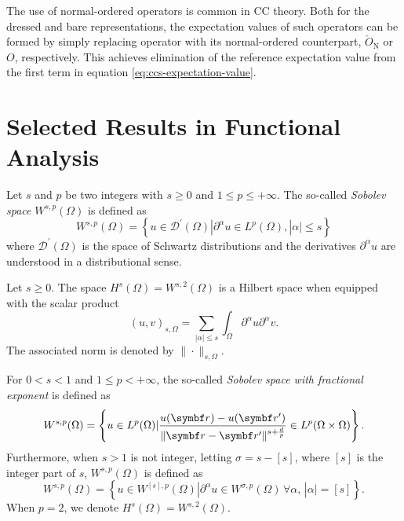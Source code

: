 The use of normal-ordered operators is common in \acrlong*{CC} theory. Both for
the dressed and bare representations, the expectation values of such operators
can be formed by simply replacing operator with its normal-ordered counterpart,
$\check{O}_\mathrm{N}$ or $O$, respectively.
This achieves elimination of the reference expectation value from the first
term in equation \eqref{eq:ccs-expectation-value}.

\section{Selected Results in Functional Analysis}

\begin{defin}
Let $s$ and $p$ be two integers with $s\geq 0$ and $1\leq p \leq +\infty$.
The so-called \emph{Sobolev space} $W^{s, p}(\Omega)$ is defined as
\begin{equation}
W^{s,p}(\Omega) =
\left\lbrace
u \in \mathcal{D}^\prime(\Omega) | \partial^\alpha u \in L^p(\Omega), |\alpha|\leq s
\right\rbrace
\end{equation}
where $\mathcal{D}^\prime(\Omega)$ is the space of Schwartz distributions and the
derivatives $\partial^\alpha u$ are understood in a distributional sense.
\end{defin}

\begin{lemma}
Let $s\geq 0$. The space $H^s(\Omega) = W^{s, 2}(\Omega)$ is a Hilbert space
when equipped with the scalar product
\begin{equation}
(u, v)_{s, \Omega} = \sum_{|\alpha|\leq s}\int_\Omega\partial^\alpha u \partial^\alpha v.
\end{equation}
The associated norm is denoted by $\| \cdot \|_{s, \Omega}$.
\end{lemma}

\begin{defin}
For $0 < s < 1$ and $1 \leq p < +\infty$, the so-called \emph{Sobolev space with fractional
exponent} is defined as
\begin{equation}
W^{s, p}(\Omega) =
\left\lbrace
u \in L^p(\Omega) |
\frac{u(\vect{r}) - u(\vect{r}^\prime)}{\| \vect{r} - \vect{r}^\prime\|^{s+\frac{d}{p}}}
\in L^p(\Omega \times \Omega)
\right\rbrace.
\end{equation}
Furthermore, when $s> 1$ is not integer, letting $\sigma = s - [s]$, where $[s]$ is the integer
part of $s$, $W^{s,p}(\Omega)$ is defined as
\begin{equation}
W^{s, p}(\Omega) =
\left\lbrace
u \in W^{[s], p}(\Omega) |
\partial^\alpha u \in W^{\sigma, p}(\Omega)\, \forall \alpha,\, |\alpha| = [s]
\right\rbrace.
\end{equation}
When $p=2$, we denote $H^s(\Omega) = W^{s,2}(\Omega)$.
\end{defin}

